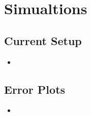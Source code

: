 \chapter{Simualtions}\label{ch:simulations}


\section{Current Setup}
\begin{itemize}
    \item
\end{itemize}

\section{Error Plots}
\begin{itemize}
    \item
\end{itemize}












